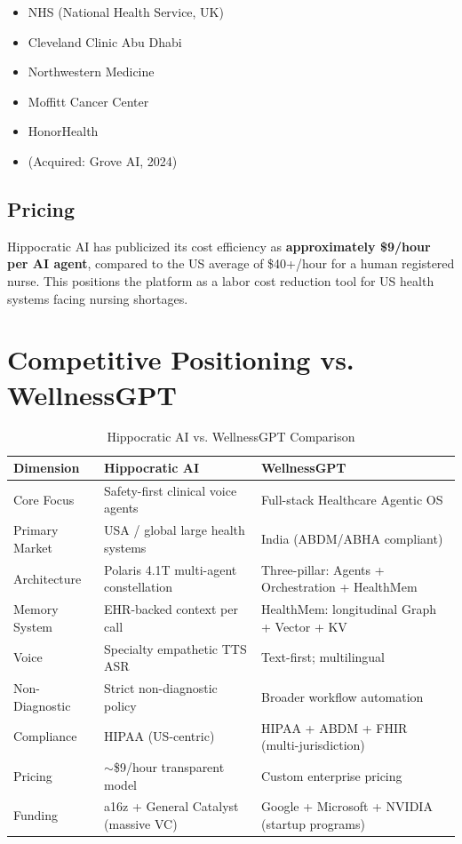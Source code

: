 \documentclass[12pt,a4paper]{article}
\begin{document}
\begin{itemize}[noitemsep]
    \item NHS (National Health Service, UK)
    \item Cleveland Clinic Abu Dhabi
    \item Northwestern Medicine
    \item Moffitt Cancer Center
    \item HonorHealth
    \item (Acquired: Grove AI, 2024)
\end{itemize}

\subsection{Pricing}

Hippocratic AI has publicized its cost efficiency as \textbf{approximately \$9/hour per AI agent}, compared to the US average of \$40+/hour for a human registered nurse. This positions the platform as a labor cost reduction tool for US health systems facing nursing shortages.

\newpage

\section{Competitive Positioning vs. WellnessGPT}

\begin{table}[H]
\centering
\renewcommand{\arraystretch}{1.5}
\begin{tabularx}{\textwidth}{lXX}
\toprule
\textbf{Dimension} & \textbf{Hippocratic AI} & \textbf{WellnessGPT} \\
\midrule
Core Focus       & Safety-first clinical voice agents & Full-stack Healthcare Agentic OS \\
Primary Market   & USA / global large health systems & India (ABDM/ABHA compliant) \\
Architecture     & Polaris 4.1T multi-agent constellation & Three-pillar: Agents + Orchestration + HealthMem \\
Memory System    & EHR-backed context per call & HealthMem: longitudinal Graph + Vector + KV \\
Voice            & Specialty empathetic TTS ASR & Text-first; multilingual \\
Non-Diagnostic   & Strict non-diagnostic policy & Broader workflow automation \\
Compliance       & HIPAA (US-centric) & HIPAA + ABDM + FHIR (multi-jurisdiction) \\
Pricing          & $\sim$\$9/hour transparent model & Custom enterprise pricing \\
Funding          & a16z + General Catalyst (massive VC) & Google + Microsoft + NVIDIA (startup programs) \\
\bottomrule
\end{tabularx}
\caption{Hippocratic AI vs. WellnessGPT Comparison}
\end{table}
\end{document}
